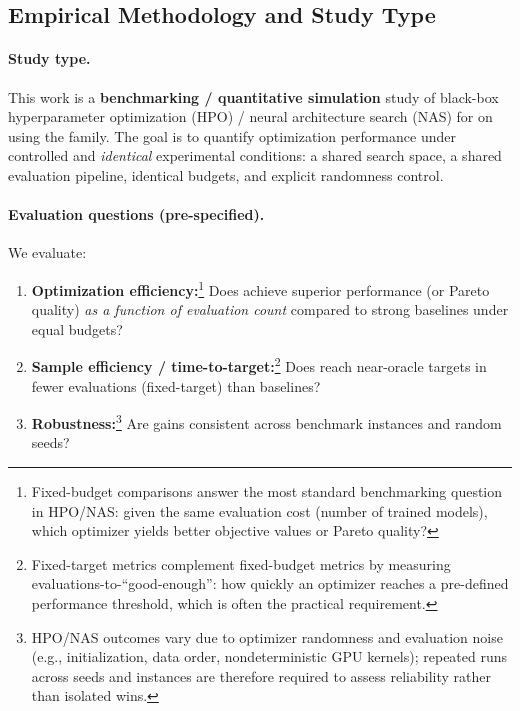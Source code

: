 \subsection{Empirical Methodology and Study Type}
\label{subsec:methodology}

\paragraph{Study type.}
This work is a \textbf{benchmarking / quantitative simulation} study of black-box hyperparameter optimization (HPO) / neural architecture search (NAS)
for \textbf{\TaskDomain{}} on \textbf{\DatasetsSplits{}} using the \textbf{\ModelClass{}} family.
The goal is to quantify optimization performance under controlled and \emph{identical} experimental conditions:
a shared search space, a shared evaluation pipeline, identical budgets, and explicit randomness control.

\paragraph{Evaluation questions (pre-specified).}
We evaluate:
\begin{enumerate}
    \item \textbf{Optimization efficiency:}\footnote{Fixed-budget comparisons answer the most standard benchmarking question in HPO/NAS:
    given the same evaluation cost (number of trained models), which optimizer yields better objective values or Pareto quality?}
    Does \ProposedMethodName{} achieve superior performance (or Pareto quality) \emph{as a function of evaluation count}
    compared to strong baselines under equal budgets?

    \item \textbf{Sample efficiency / time-to-target:}\footnote{Fixed-target metrics complement fixed-budget metrics by measuring
    evaluations-to-``good-enough'': how quickly an optimizer reaches a pre-defined performance threshold, which is often the practical requirement.}
    Does \ProposedMethodName{} reach near-oracle targets in fewer evaluations (fixed-target) than baselines?

    \item \textbf{Robustness:}\footnote{HPO/NAS outcomes vary due to optimizer randomness and evaluation noise (e.g., initialization, data order,
    nondeterministic GPU kernels); repeated runs across seeds and instances are therefore required to assess reliability rather than isolated wins.}
    Are gains consistent across benchmark instances and random seeds?
\end{enumerate}

